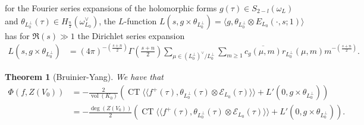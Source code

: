 \documentclass{amsart}
\newtheorem{theorem}{Theorem}[section]
\theoremstyle{definition}
\theoremstyle{definition}
\theoremstyle{definition}
\begin{document}
for the Fourier series expansions of the holomorphic forms $g(\tau) \in S_{2-l}(\omega_L)$
and $\theta_{L_0^{\perp}}(\tau) \in H_{\frac{n}{2}}(\omega_{L_0}^{\vee})$, the $L$-function
$L(s, g \times \theta_{L_0^{\perp}}) = \langle g, \theta_{L_0^{\perp}} \otimes E_{L_0}(\cdot, s; 1) \rangle$ 
has for $\Re(s) \gg 1$ the Dirichlet series expansion
\begin{align}\label{RS-CM} L(s, g \times \theta_{L_0^{\perp}}) 
&= (4 \pi)^{- \left( \frac{s+n}{2} \right)} \Gamma \left( \frac{s+n}{2} \right)
\sum\limits_{ \mu \in (L_0^{\perp})^{\vee}/L_0^{\perp} }\sum\limits_{ m \geq 1 } \overline{c_g(\mu, m)} r_{L_0^{\perp}}(\mu, m) m^{- \left( \frac{s+n}{2} \right)}. \end{align}

\begin{theorem}[Bruinier-Yang]\label{BY4.7} We have that
\begin{align*} \Phi(f, Z(V_0)) &= - \frac{2}{\operatorname{vol}(K_0)} \left(
\operatorname{CT} \langle \langle f^+(\tau), \theta_{L_0^{\perp}}(\tau) \otimes \mathcal{E}_{L_0}(\tau) \rangle \rangle
+ L'(0, g \times \theta_{L_0^{\perp}}) \right) \\
&= - \frac{\operatorname{deg}(Z(V_0))}{2} \left( \operatorname{CT} \langle \langle f^+(\tau), \theta_{L_0^{\perp}}(\tau) \otimes \mathcal{E}_{L_0}(\tau) \rangle \rangle
+ L'(0, g \times \theta_{L_0^{\perp}}) \right). \end{align*} \end{theorem}
\end{document}

